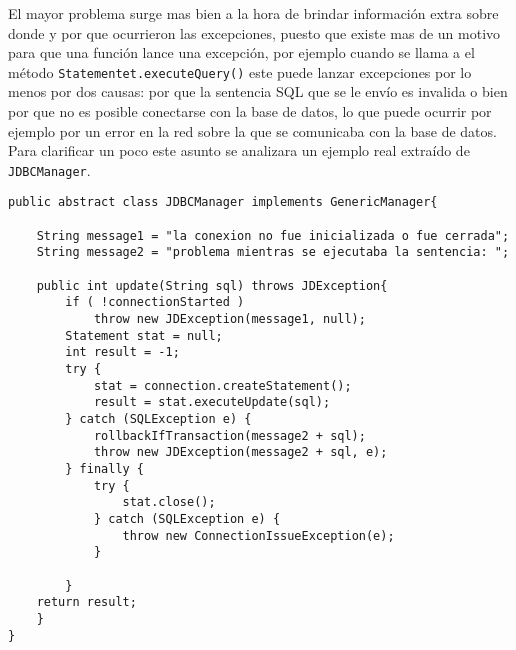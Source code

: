 El mayor problema surge mas bien a la hora de brindar información extra sobre donde y por que ocurrieron las excepciones, puesto que existe mas de un motivo para que una función lance una excepción, por ejemplo cuando se llama a el método \verb=Statementet.executeQuery()= este puede lanzar excepciones por lo menos por dos causas: por que la sentencia SQL que se le envío es invalida o bien por que no es posible conectarse con la base de datos, lo que puede ocurrir por ejemplo por un error en la red sobre la que se comunicaba con la base de datos. Para clarificar un poco este asunto se analizara un ejemplo real extraído de \verb=JDBCManager=.
%
\begin{lstlisting}[title=función extraída de JDBCManager]
public abstract class JDBCManager implements GenericManager{

	String message1 = "la conexion no fue inicializada o fue cerrada";
	String message2 = "problema mientras se ejecutaba la sentencia: ";
	
	public int update(String sql) throws JDException{
		if ( !connectionStarted ) 
			throw new JDException(message1, null);
		Statement stat = null;
		int result = -1;
		try {
			stat = connection.createStatement();
			result = stat.executeUpdate(sql);
		} catch (SQLException e) {
			rollbackIfTransaction(message2 + sql);
			throw new JDException(message2 + sql, e);
		} finally {
			try {
				stat.close();
			} catch (SQLException e) {
				throw new ConnectionIssueException(e);
			}
			
		}
	return result; 
	}
}
\end{lstlisting}
%
